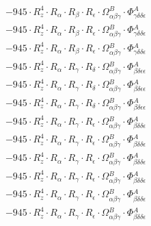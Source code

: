 \documentclass{article}
\begin{document}
\begin{subequations}
\begin{gather}
\begin{array}{c}
 \\[0.2em] 		 - 945 \cdot R_{z}^{4} \cdot R_{\alpha{}} \cdot R_{\beta{}} \cdot R_{\epsilon{}} \cdot \Omega{}^{B}_{\alpha{}\beta{}\gamma{}} \cdot \Phi{}^{A}_{\gamma{}\delta{}\delta{}\epsilon{}} 
 \\[0.2em] 		 - 945 \cdot R_{z}^{4} \cdot R_{\alpha{}} \cdot R_{\beta{}} \cdot R_{\epsilon{}} \cdot \Omega{}^{B}_{\alpha{}\beta{}\gamma{}} \cdot \Phi{}^{A}_{\gamma{}\delta{}\delta{}\epsilon{}} 
 \\[0.2em] 		 - 945 \cdot R_{z}^{4} \cdot R_{\alpha{}} \cdot R_{\beta{}} \cdot R_{\epsilon{}} \cdot \Omega{}^{B}_{\alpha{}\beta{}\gamma{}} \cdot \Phi{}^{A}_{\gamma{}\delta{}\delta{}\epsilon{}} 
 \\[0.2em] 		 - 945 \cdot R_{z}^{4} \cdot R_{\alpha{}} \cdot R_{\gamma{}} \cdot R_{\delta{}} \cdot \Omega{}^{B}_{\alpha{}\beta{}\gamma{}} \cdot \Phi{}^{A}_{\beta{}\delta{}\epsilon{}\epsilon{}} 
 \\[0.2em] 		 - 945 \cdot R_{z}^{4} \cdot R_{\alpha{}} \cdot R_{\gamma{}} \cdot R_{\delta{}} \cdot \Omega{}^{B}_{\alpha{}\beta{}\gamma{}} \cdot \Phi{}^{A}_{\beta{}\delta{}\epsilon{}\epsilon{}} 
 \\[0.2em] 		 - 945 \cdot R_{z}^{4} \cdot R_{\alpha{}} \cdot R_{\gamma{}} \cdot R_{\delta{}} \cdot \Omega{}^{B}_{\alpha{}\beta{}\gamma{}} \cdot \Phi{}^{A}_{\beta{}\delta{}\epsilon{}\epsilon{}} 
 \\[0.2em] 		 - 945 \cdot R_{z}^{4} \cdot R_{\alpha{}} \cdot R_{\gamma{}} \cdot R_{\epsilon{}} \cdot \Omega{}^{B}_{\alpha{}\beta{}\gamma{}} \cdot \Phi{}^{A}_{\beta{}\delta{}\delta{}\epsilon{}} 
 \\[0.2em] 		 - 945 \cdot R_{z}^{4} \cdot R_{\alpha{}} \cdot R_{\gamma{}} \cdot R_{\epsilon{}} \cdot \Omega{}^{B}_{\alpha{}\beta{}\gamma{}} \cdot \Phi{}^{A}_{\beta{}\delta{}\delta{}\epsilon{}} 
 \\[0.2em] 		 - 945 \cdot R_{z}^{4} \cdot R_{\alpha{}} \cdot R_{\gamma{}} \cdot R_{\epsilon{}} \cdot \Omega{}^{B}_{\alpha{}\beta{}\gamma{}} \cdot \Phi{}^{A}_{\beta{}\delta{}\delta{}\epsilon{}} 
 \\[0.2em] 		 - 945 \cdot R_{z}^{4} \cdot R_{\alpha{}} \cdot R_{\gamma{}} \cdot R_{\epsilon{}} \cdot \Omega{}^{B}_{\alpha{}\beta{}\gamma{}} \cdot \Phi{}^{A}_{\beta{}\delta{}\delta{}\epsilon{}} 
 \\[0.2em] 		 - 945 \cdot R_{z}^{4} \cdot R_{\alpha{}} \cdot R_{\gamma{}} \cdot R_{\epsilon{}} \cdot \Omega{}^{B}_{\alpha{}\beta{}\gamma{}} \cdot \Phi{}^{A}_{\beta{}\delta{}\delta{}\epsilon{}} 
 \\[0.2em] 		 - 945 \cdot R_{z}^{4} \cdot R_{\alpha{}} \cdot R_{\gamma{}} \cdot R_{\epsilon{}} \cdot \Omega{}^{B}_{\alpha{}\beta{}\gamma{}} \cdot \Phi{}^{A}_{\beta{}\delta{}\delta{}\epsilon{}} 

\end{array}
\end{gather}
\end{subequations}
\end{document}
